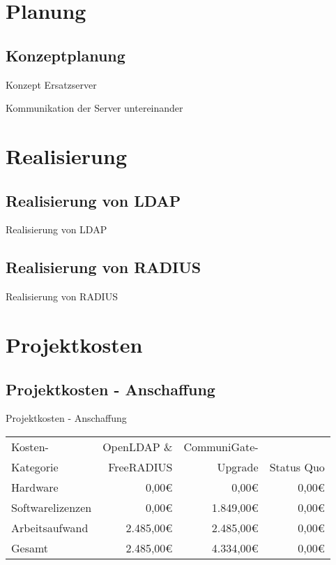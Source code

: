 \documentclass[handout,svgnames]{beamer}
\newcommand{\mcc}[2]{\multicolumn{#1}{|c|}{#2}} %
\begin{document}
\section{Planung}
\subsection{Konzeptplanung}
\begin{frame}{Konzept Ersatzserver}

\end{frame}

\begin{frame}{Kommunikation der Server untereinander}

\end{frame}


\section{Realisierung}
\subsection{Realisierung von LDAP}
\begin{frame}{Realisierung von LDAP}

\end{frame}

\subsection{Realisierung von RADIUS}
\begin{frame}{Realisierung von RADIUS}

\end{frame}

\section{Projektkosten}
\subsection{Projektkosten - Anschaffung}
\begin{frame}{Projektkosten - Anschaffung}
	\begin{tabularx}{\textwidth}{|X|r|r|r|}
		\hline
		Kosten-	&	OpenLDAP \& &	\centering CommuniGate- &	\\
		Kategorie	&	FreeRADIUS &	\centering Upgrade &	Status Quo\\
		\hline
		Hardware &	0,00\euro{} &	0,00\euro{} &	0,00\euro{}\\
		\hline
		Softwarelizenzen &	0,00\euro{} &	1.849,00\euro{} &	0,00\euro{}\\
		\hline
		Arbeitsaufwand &	2.485,00\euro{} &	2.485,00\euro{} &	0,00\euro{}\\
		\hhline{|=|=|=|=|}
		Gesamt &	2.485,00\euro{} &	4.334,00\euro{} &	0,00\euro{}\\
		\hline
	\end{tabularx}
\end{frame}
\end{document}

